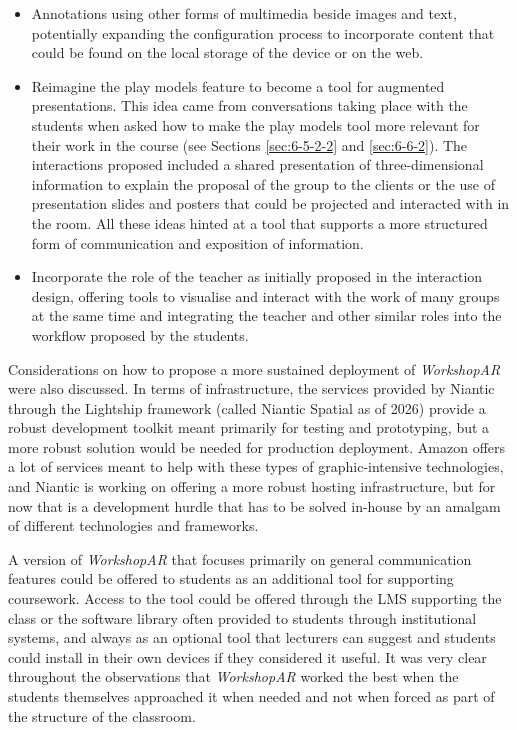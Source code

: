 \begin{itemize}
    \item Annotations using other forms of multimedia beside images and text, potentially expanding the configuration process to incorporate content that could be found on the local storage
    of the device or on the web.
    \item Reimagine the play models feature to become a tool for augmented presentations. This idea came from conversations taking place with the students when asked how to make the play models
    tool more relevant for their work in the course (see Sections \ref{sec:6-5-2-2} and \ref{sec:6-6-2}). The interactions proposed included a shared presentation of three-dimensional information
    to explain the proposal of the group to the clients or the use of presentation slides and posters that could be projected and interacted with in the room. All these ideas hinted at a tool
    that supports a more structured form of communication and exposition of information.
    \item Incorporate the role of the teacher as initially proposed in the interaction design, offering tools to visualise and interact with the work of many groups at the same time and
    integrating the teacher and other similar roles into the workflow proposed by the students.
\end{itemize}

Considerations on how to propose a more sustained deployment of \emph{WorkshopAR} were also discussed. In terms of infrastructure, the services provided by Niantic through the Lightship framework
(called Niantic Spatial as of 2026) provide a robust development toolkit meant primarily for testing and prototyping, but a more robust solution would be needed for production deployment. Amazon
offers a lot of services meant to help with these types of graphic-intensive technologies, and Niantic is working on offering a more robust hosting infrastructure, but for now that is a development
hurdle that has to be solved in-house by an amalgam of different technologies and frameworks.

A version of \emph{WorkshopAR} that focuses primarily on general communication features could be offered to students as an additional tool for supporting coursework. Access to the tool could be offered
through the \ac{LMS} supporting the class or the software library often provided to students through institutional systems, and always as an optional tool that lecturers can suggest and students could
install in their own devices if they considered it useful. It was very clear throughout the observations that \emph{WorkshopAR} worked the best when the students themselves approached it when needed and
not when forced as part of the structure of the classroom.

